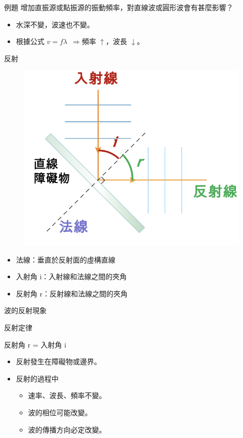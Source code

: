 \documentclass[13pt]{beamer}
\begin{document}
\begin{frame}{例題}
    增加直振源或點振源的振動頻率，對直線波或圓形波會有甚麼影響？

    \bigskip
    \begin{itemize}
        \item 水深不變，波速也不變。
        \item 根據公式 \(v=f\lambda\)\ $\Rightarrow$頻率 $\uparrow$，波長 $\downarrow$。
    \end{itemize}

\end{frame}


\begin{frame}{反射}
    \begin{figure}
        \centering
        \includegraphics[width=0.5\linewidth]{images/Screenshot 2023-09-26 at 11.31.26 PM.png}


    \end{figure}
    \begin{itemize}
        \item 法線：垂直於反射面的虛構直線
        \item 入射角 i：入射線和法線之間的夾角
        \item 反射角 r：反射線和法線之間的夾角
    \end{itemize}
\end{frame}

\begin{frame}{波的反射現象}
    \begin{exampleblock}{反射定律}

        反射角 r = 入射角 i
    \end{exampleblock}
    \begin{itemize}
        \item 反射發生在障礙物或邊界。
        \item 反射的過程中
              \begin{itemize}
                  \item 速率、波長、頻率不變。
                  \item 波的相位可能改變。
                  \item 波的傳播方向必定改變。
              \end{itemize}
    \end{itemize}

\end{frame}
\end{document}
